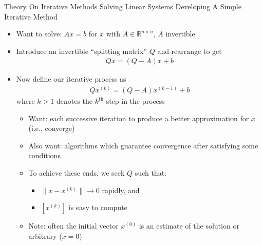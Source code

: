 \documentclass[9pt, serif]{beamer}
\newlength{\wideitemsep}
\let\olditem\item
\renewcommand{\item}{\setlength{\itemsep}{\wideitemsep}\olditem}
\newcommand{\bi}{\begin{itemize}}
\newcommand{\ei}{\end{itemize}}
\newcommand{\norm}[1]{\lVert#1\rVert}
\begin{document}
\begin{frame}{Theory On Iterative Methods Solving Linear Systems}
    \pause
    Developing A Simple Iterative Method \pause
    \bi
        \item Want to solve: $Ax=b$ for $x$ with $A \in \mathbb{R}^{n \times n}$, $A$ invertible \pause
        \item Introduce an invertible ``splitting matrix'' $Q$ and rearrange to get
	    \begin{align*}
		    Qx = (Q - A)x + b
	    \end{align*} \pause
        \vspace{-5mm}
        \item Now define our iterative process as
	    \begin{align*}
		    Qx^{(k)} = (Q - A)x^{(k-1)} + b
	    \end{align*}
        where $k > 1$ denotes the $k^{\text{th}}$ step in the process \pause
        \bi
            \item Want: each successive iteration to produce a better approximation for $x$ (i.e., converge) \pause
	        \item Also want: algorithms which guarantee convergence after satisfying some conditions \pause
            \item To achieve these ends, we seek $Q$ such that:
            \bi
                \item $\norm{x-x^{(k)}} \to 0$ rapidly, and
                \item $\left[x^{(k)}\right]$ is easy to compute
            \ei \pause
            \item Note: often the initial vector $x^{(0)}$ is an estimate of the solution or arbitrary ($x = 0$)
        \ei
    \ei
\end{frame}
\end{document}
